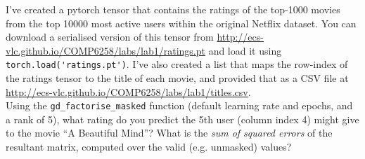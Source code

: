 \documentclass[a4paper]{article}
\begin{document}
\begin{tcolorbox}[title=4.1 Predict a movie rating (1 mark)]

I've created a pytorch tensor that contains the ratings of the top-1000 movies from the top 10000 most active users within the original Netflix dataset. You can download a serialised version of this tensor from \url{http://ecs-vlc.github.io/COMP6258/labs/lab1/ratings.pt} and load it using \verb|torch.load('ratings.pt')|. I've also created a list that maps the row-index of the ratings tensor to the title of each movie, and provided that as a CSV file at \url{http://ecs-vlc.github.io/COMP6258/labs/lab1/titles.csv}. 
\\[1em]
Using the \verb|gd_factorise_masked| function (default learning rate and epochs, and a rank of 5), what rating do you predict the 5th user (column index 4) might give to the movie ``A Beautiful Mind''? What is the \emph{sum of squared errors} of the resultant matrix, computed over the valid (e.g. unmasked) values?

\end{tcolorbox}
\end{document}
